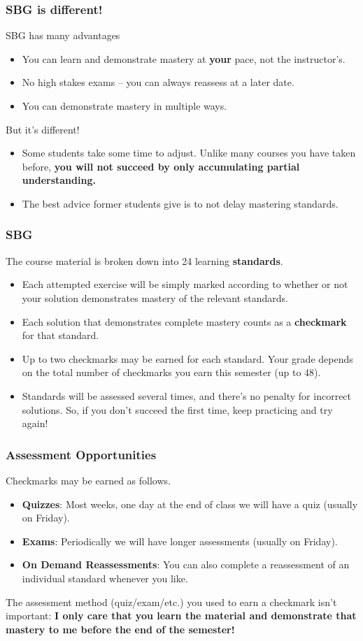 \documentclass[aspectration=1610]{beamer}
\begin{document}
\begin{frame}\frametitle{SBG is different!}
SBG has many advantages
\begin{itemize}
\item You can learn and demonstrate mastery at \textbf{your} pace, not the instructor's.
\item No high stakes exams -- you can always reassess at a later date.
\item You can demonstrate mastery in multiple ways.
\end{itemize}
\vfill
But it's different!
\begin{itemize}
\item Some students take some time to adjust.  Unlike many courses you have taken before, \textbf{you will not succeed by only accumulating partial understanding.}
\item The best advice former students give is to not delay mastering standards.
\end{itemize}
\end{frame}




\begin{frame}\frametitle{SBG}
The course material is broken down into 24 learning \textbf{standards}.
\begin{itemize}
\item Each attempted exercise will be simply marked according to whether or not
      your solution demonstrates mastery of the relevant standards.
\item Each solution that demonstrates complete mastery counts as a
      \textbf{checkmark} for that standard.
\item Up to two checkmarks may be earned for each standard. Your grade depends
      on the total number of checkmarks you earn this semester (up to 48).
\item Standards will be assessed several times, and there's no penalty for
      incorrect solutions. So, if you don't succeed the first time,
      keep practicing and try again!
\end{itemize}
\end{frame}

\begin{frame}\frametitle{Assessment Opportunities}
Checkmarks may be earned as follows.
\begin{itemize}
\item {\bf Quizzes}: Most weeks, one day at the end of class we will have a quiz (usually on Friday). 
\item {\bf Exams}: Periodically we will have longer assessments (usually on Friday).
\item {\bf On Demand Reassessments}: You can also complete a reassessment of an individual standard whenever you like.
\end{itemize}

\pause

\vspace{0.2in}

The assessment method (quiz/exam/etc.) you used to earn a checkmark
isn't important: \textbf{I only care that you
learn the material and demonstrate that mastery to me before the end of the
semester!}
\end{frame}
\end{document}
